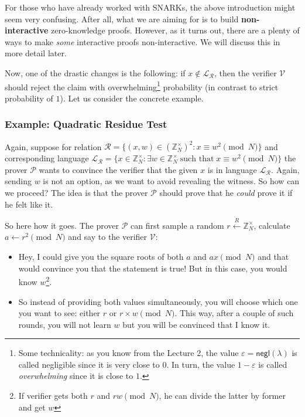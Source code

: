 \documentclass[../lecture-notes.tex]{subfiles}
\begin{document}
\begin{remark}
    For those who have already worked with SNARKs, the above introduction might seem very confusing. After all, what we are aiming for is to build \textbf{non-interactive} zero-knowledge proofs. However, as it turns out, there are a plenty of ways to make \textit{some} interactive proofs non-interactive. We will discuss this in more detail later.
\end{remark}

Now, one of the drastic changes is the following: if $x \not\in \mathcal{L}_{\mathcal{R}}$, then the verifier $\mathcal{V}$ should reject the claim with overwhelming\footnote{Some technicality: as you know from the Lecture 2, the value $\varepsilon = \mathsf{negl}(\lambda)$ is called negligible since it is very close to $0$. In turn, the value $1-\varepsilon$ is called \textit{overwhelming} since it is close to $1$.} probability (in contrast to strict probability of $1$). Let us consider the concrete example.

\subsubsection{Example: Quadratic Residue Test}\label{section:quadratic_residue_test}

Again, suppose for relation $\mathcal{R} = \{(x,w) \in (\mathbb{Z}_N^{\times})^2: x \equiv w^2 \pmod{N}\}$ and corresponding language $\mathcal{L}_{\mathcal{R}} = \{x \in \mathbb{Z}_N^{\times}: \exists w \in \mathbb{Z}_N^{\times} \; \text{such that} \; x \equiv w^2 \pmod{N}\}$ the prover $\mathcal{P}$ wants to convince the verifier that the given $x$ is in language $\mathcal{L}_{\mathcal{R}}$. Again, sending $w$ is not an option, as we want to avoid revealing the witness. So how can we proceed? The idea is that the prover $\mathcal{P}$ should prove that he \textit{could} prove it if he felt like it. 

So here how it goes. The prover $\mathcal{P}$ can first sample a random $r \xleftarrow{R} \mathbb{Z}_N^{\times}$, calculate $a \gets r^2 \pmod{N}$ and say to the verifier $\mathcal{V}$: 
\begin{itemize}
    \item Hey, I could give you the square roots of both $a$ and $ax \pmod{N}$ and that would convince you that the statement is true! But in this case, you would know $w$\footnote{If verifier gets both $r$ and $rw \pmod{N}$, he can divide the latter by former and get $w$}.
    \item So instead of providing both values simultaneously, you will choose which one you want to see: either $r$ or $r\times w\pmod{N}$. This way, after a couple of such rounds, you will not learn $w$ but you will be convinced that I know it.
\end{itemize}
\end{document}
